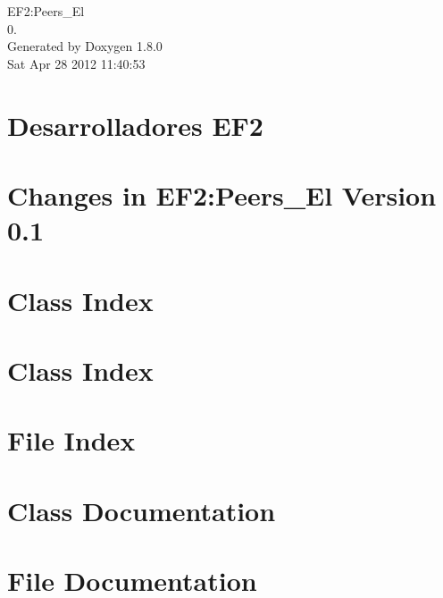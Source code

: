 \documentclass{book}
\begin{document}
\hypersetup{pageanchor=false,citecolor=blue}
\begin{titlepage}
\vspace*{7cm}
\begin{center}
{\Large E\-F2\-:Peers\-\_\-\-El \\[1ex]\large 0. }\\
\vspace*{1cm}
{\large Generated by Doxygen 1.8.0}\\
\vspace*{0.5cm}
{\small Sat Apr 28 2012 11:40:53}\\
\end{center}
\end{titlepage}
\clearemptydoublepage
{}
\tableofcontents
\clearemptydoublepage
{}
\hypersetup{pageanchor=true,citecolor=blue}
\chapter{Desarrolladores E\-F2}
\label{developers}
\hypertarget{developers}{}

\chapter{Changes in E\-F2\-:Peers\-\_\-\-El Version 0.1}
\label{changelog0_1}
\hypertarget{changelog0_1}{}

\chapter{Class Index}

\chapter{Class Index}

\chapter{File Index}

\chapter{Class Documentation}














\chapter{File Documentation}


















\printindex
\end{document}
